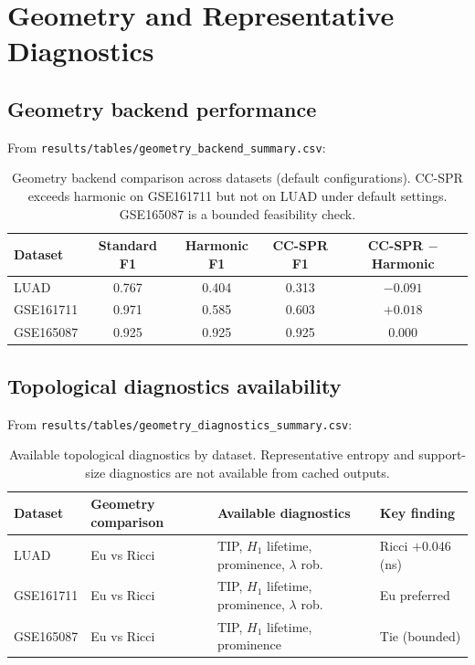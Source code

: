 \documentclass[11pt]{article}
\begin{document}
\section{Geometry and Representative Diagnostics}
\label{sec:diag_supp}

\subsection{Geometry backend performance}
From \texttt{results/tables/geometry\_backend\_summary.csv}:

\begin{table}[h]
\centering
\small
\begin{tabular}{lcccc}
\toprule
Dataset & Standard F1 & Harmonic F1 & CC-SPR F1 & CC-SPR $-$ Harmonic \\
\midrule
LUAD & 0.767 & 0.404 & 0.313 & $-0.091$ \\
GSE161711 & 0.971 & 0.585 & 0.603 & $+0.018$ \\
GSE165087 & 0.925 & 0.925 & 0.925 & $0.000$ \\
\bottomrule
\end{tabular}
\caption{Geometry backend comparison across datasets (default configurations).
CC-SPR exceeds harmonic on GSE161711 but not on LUAD under default settings.
GSE165087 is a bounded feasibility check.}
\label{tab:geom_supp}
\end{table}

\subsection{Topological diagnostics availability}
From \texttt{results/tables/geometry\_diagnostics\_summary.csv}:

\begin{table}[h]
\centering
\small
\begin{tabular}{llll}
\toprule
Dataset & Geometry comparison & Available diagnostics & Key finding \\
\midrule
LUAD & Eu vs Ricci & TIP, $H_1$ lifetime, prominence, $\lambda$ rob. & Ricci $+0.046$ (ns) \\
GSE161711 & Eu vs Ricci & TIP, $H_1$ lifetime, prominence, $\lambda$ rob. & Eu preferred \\
GSE165087 & Eu vs Ricci & TIP, $H_1$ lifetime, prominence & Tie (bounded) \\
\bottomrule
\end{tabular}
\caption{Available topological diagnostics by dataset.
Representative entropy and support-size diagnostics are not available from cached outputs.}
\label{tab:diag_supp}
\end{table}
\end{document}
